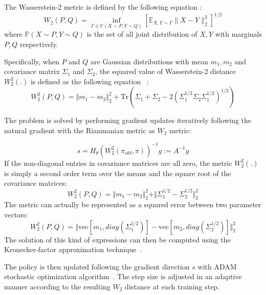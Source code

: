 The Wasserstein-2 metric is defined by the following equation \cite{villani2003topics}:
\begin{equation}
    W_2(P,Q) = 
    \inf_{\Gamma \in \mathbb{P}(X \sim P, Y \sim Q)}
   \left[  \mathbb{E}_{X,Y \sim \Gamma} \lVert X-Y \rVert_2^2 \right]^{1/2}
\end{equation}
where $\mathbb{P}(X \sim P, Y \sim Q)$ is the set of all joint distribution of $X,Y$ with marginals $P,Q$ respectively.

Specifically, when $P$ and $Q$ are Gaussian distributions with mean $m_1,m_2$ and covariance matrix $\Sigma_1$ and $\Sigma_2$, the squared value of Wasserstein-2 distance $W_2^2(.)$ is defined as the following equation~\cite{chafai} :
\begin{equation}
    W_2^2(P,Q) = \Vert m_1-m_2\Vert_2^2 +\mathrm{Tr}\left(\Sigma_1+\Sigma_2-2(\Sigma_1^{1/2}\Sigma_2\Sigma_1^{1/2})^{1/2}\right)
\end{equation}

The problem is solved by performing gradient updates iteratively following the natural gradient with the Rianmanian metric as $W_2$ metric:

\begin{equation}
    s=H_\theta\left( \overline{W_2^2}(\pi_{old},\pi) \right)^{-1}g := A^{-1}g
\end{equation}
%
%
If the non-diagonal entries in covariance matrices are all zero, the metric $W_2^2(.)$ is simply a second order term over the means and the square root of the covariance matrices:
\begin{equation}
W_2^2(P,Q) = \Vert m_1-m_2\Vert_2^2 +\Vert \Sigma_1^{1/2}-\Sigma_2^{1/2}\Vert_2^2
\end{equation}
The metric can actually be represented as a squared error between two parameter vectors:
\begin{equation}
W_2^2(P,Q) = \Vert \text{vec}[m_1,diag(\Sigma_1^{1/2})]-\text{vec}[m_2,diag(\Sigma_2^{1/2})]\Vert_2^2 
\end{equation}
The solution of this kind of expressions can then be computed using the Kronecker-factor approximation technique~\cite{wu2017scalable}.

The policy is then updated following the gradient direction $s$ with ADAM stochastic optimization algorithm~\cite{kingma2014adam}. The step size is adjusted in an adaptive manner according to the resulting $W_2$ distance at each training step.